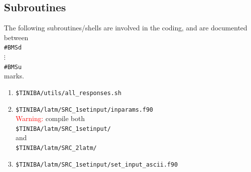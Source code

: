 \subsection{Subroutines}

The following subroutines/shells are involved in the coding,
and are documented between\\
\verb=#BMSd=\\
$\vdots$\\
\verb=#BMSu=\\
marks.
\begin{enumerate}
\item \verb=$TINIBA/utils/all_responses.sh=
\item \verb=$TINIBA/latm/SRC_1setinput/inparams.f90=\\
\textcolor{red}{Warning:} compile both\\
\verb=$TINIBA/latm/SRC_1setinput/= \\
and\\
\verb=$TINIBA/latm/SRC_2latm/= 
\item \verb=$TINIBA/latm/SRC_1setinput/set_input_ascii.f90=\\
\end{enumerate}
